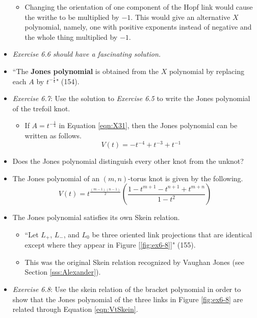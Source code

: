\documentclass[titlepage]{article}
\numberwithin{figure}{section}
\numberwithin{table}{section}
\numberwithin{equation}{section}
\newcommand{\dq}[2]{``#1" (#2).}
\begin{document}
\begin{itemize}
\begin{itemize}
        \item Changing the orientation of one component of the Hopf link would cause the writhe to be multiplied by $-1$. This would give an alternative $X$ polynomial, namely, one with positive exponents instead of negative and the whole thing multiplied by $-1$.
    \end{itemize}
    \item \emph{Exercise 6.6 should have a fascinating solution.} 
    \item \dq{The \textbf{Jones polynomial} is obtained from the $X$ polynomial by replacing each $A$ by $t^{-\frac{1}{4}}$}{154}
    \item \emph{Exercise 6.7}: Use the solution to \emph{Exercise 6.5} to write the Jones polynomial of the trefoil knot.
    \begin{itemize}
        \item If $A=t^{-\frac{1}{4}}$ in Equation \ref{eqn:X31}, then the Jones polynomial can be written as follows.
        \begin{equation*}
            V(t)=-t^{-4}+t^{-3}+t^{-1}
        \end{equation*}
    \end{itemize}
    \item Does the Jones polynomial distinguish every other knot from the unknot?
    \item The Jones polynomial of an $(m,n)$-torus knot is given by the following.
    \begin{equation*}
        V(t)=t^{\frac{(m-1)(n-1)}{2}}\left( \frac{1-t^{m+1}-t^{n+1}+t^{m+n}}{1-t^2} \right)
    \end{equation*}
    \item The Jones polynomial satisfies its own Skein relation.
    \begin{itemize}
        \item \dq{Let $L_+$, $L_-$, and $L_0$ be three oriented link projections that are identical except where they appear in Figure [\ref{fig:ex6-8}]}{155}
        \item This was the original Skein relation recognized by Vaughan Jones (see Section \ref{sss:Alexander}).
    \end{itemize}
    \item \emph{Exercise 6.8}: Use the skein relation of the bracket polynomial in order to show that the Jones polynomial of the three links in Figure \ref{fig:ex6-8} are related through Equation \ref{eqn:VtSkein}.
    \begin{equation}\label{eqn:VtSkein}

\end{equation}
\end{itemize}
\end{document}
